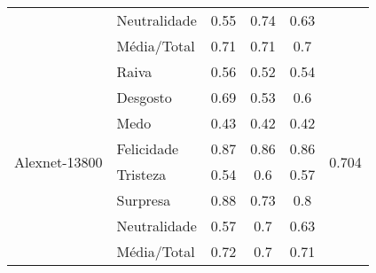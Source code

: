 \begin{table}[]
\begin{tabular}{llcccc}
                                        & Neutralidade          & 0.55                                  & 0.74                                   & 0.63                                  &                                       \\
                                        & Média/Total           & 0.71                                  & 0.71                                   & 0.7                                   &                                       \\ \hline
\multirow{8}{*}{Alexnet-13800}          & Raiva                 & 0.56                                  & 0.52                                   & 0.54                                  & \multirow{8}{*}{0.704}                \\
                                        & Desgosto              & 0.69                                  & 0.53                                   & 0.6                                   &                                       \\
                                        & Medo                  & 0.43                                  & 0.42                                   & 0.42                                  &                                       \\
                                        & Felicidade            & 0.87                                  & 0.86                                   & 0.86                                  &                                       \\
                                        & Tristeza              & 0.54                                  & 0.6                                    & 0.57                                  &                                       \\
                                        & Surpresa              & 0.88                                  & 0.73                                   & 0.8                                   &                                       \\
                                        & Neutralidade          & 0.57                                  & 0.7                                    & 0.63                                  &                                       \\
                                        & Média/Total           & 0.72                                  & 0.7                                    & 0.71                                  &                                       \\ \hline

\end{tabular}
\end{table}
